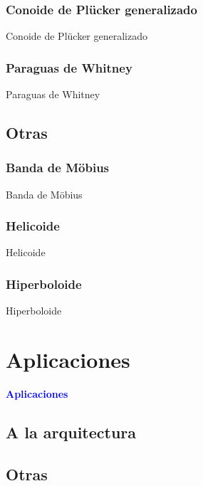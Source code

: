 \documentclass[11pt]{beamer}
\begin{document}
	\subsubsection{Conoide de Plücker generalizado}
	
	\begin{frame}{Conoide de Plücker generalizado}
		
	\end{frame}
	
	\subsubsection{Paraguas de Whitney}
	
	\begin{frame}{Paraguas de Whitney}
		
	\end{frame}
	
	\subsection{Otras}
	
	\subsubsection{Banda de Möbius}
	
	\begin{frame}{Banda de Möbius}
		
	\end{frame}
	
	\subsubsection{Helicoide}
	
	\begin{frame}{Helicoide}
		
	\end{frame}
	
	\subsubsection{Hiperboloide}
	
	\begin{frame}{Hiperboloide}
		
	\end{frame}
	
	\section{Aplicaciones}
	
		\begin{frame}
			\begin{center}
				\Huge\textbf{\textsf{\textcolor{blue}{Aplicaciones}}}
			\end{center}
		\end{frame}
	
	\subsection{A la arquitectura}
	
	\subsection{Otras}
	
	
	
	
\end{document}
